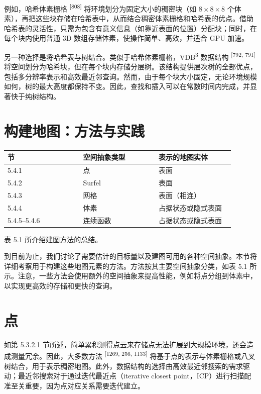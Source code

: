 例如，哈希体素栅格 \textsuperscript{[808]} 将环境划分为固定大小的稠密块（如 $8\times8\times8$ 个体素），再把这些块存储在哈希表中，从而结合稠密体素栅格和哈希表的优点。借助哈希表的灵活性，只需为包含有意义信息（如靠近表面的位置）分配块；同时，在每个块内使用普通 3D 数组存储体素，使操作简单、高效，并适合 GPU 加速。

另一种选择是将哈希表与树结合。类似于哈希体素栅格，VDB\textsuperscript{3} 数据结构 \textsuperscript{[792, 791]} 将空间划分为哈希块，但在每个块内存储分层树。该结构提供层次树的全部优点，包括多分辨率表示和高效最近邻查询。然而，由于每个块大小固定，无论环境规模如何，树的最大高度都保持不变。因此，查找和插入可以在常数时间内完成，并显著快于纯树结构。

\section{构建地图：方法与实践}

\small
\setlength{\tabcolsep}{2pt}
\begin{center}
\begin{tabular}{p{0.317\linewidth}p{0.317\linewidth}p{0.317\linewidth}}
\toprule
节 & 空间抽象类型 & 表示的地图实体 \\
\midrule
5.4.1 & 点 & 表面 \\
5.4.2 & Surfel & 表面 \\
5.4.3 & 网格 & 表面（相连） \\
5.4.4 & 体素 & 占据状态或隐式表面 \\
5.4.5–5.4.6 & 连续函数 & 占据状态或隐式表面 \\
\bottomrule
\end{tabular}
\end{center}

表 5.1 所介绍建图方法的总结。

到目前为止，我们讨论了需要估计的目标量以及建图可用的各种空间抽象。本节将详细考察用于构建这些地图元素的方法。方法按其主要空间抽象分类，如表 5.1 所示。注意，一些方法会使用额外的空间抽象来提高性能，例如将点分组到体素中，以实现更高效的存储和更快的查询。

\section{点}

如第 5.3.2.1 节所述，简单累积测得点云来存储点无法扩展到大规模环境，还会造成测量冗余。因此，大多数方法 \textsuperscript{[1269, 256, 1133]} 将基于点的表示与体素栅格或八叉树结合，用于表示稠密地图。此外，数据结构的选择由高效最近邻搜索的需求驱动；最近邻搜索对于通过迭代最近点（iterative closest point，ICP）进行扫描配准至关重要，因为点对应关系需要迭代建立。

